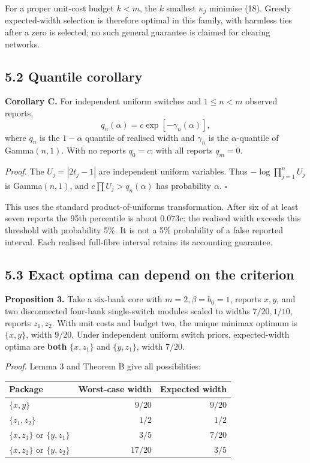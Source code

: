 \documentclass[
  british,
  11pt,
  a4paper,
]{article}
\newcounter{none} %
\begin{document}
For a proper unit-cost budget \(k<m\), the \(k\) smallest \(\kappa_j\)
minimise (18). Greedy expected-width selection is therefore optimal in
this family, with harmless ties after a zero is selected; no such
general guarantee is claimed for clearing networks.

\subsection{5.2 Quantile corollary}\label{quantile-corollary}

\textbf{Corollary C.} For independent uniform switches and \(1\le n<m\)
observed reports, \[
q_n(\alpha)=c\exp[-\gamma_n(\alpha)],
\tag{20}
\] where \(q_n\) is the \(1-\alpha\) quantile of realised width and
\(\gamma_n\) is the \(\alpha\)-quantile of Gamma\((n,1)\). With no
reports \(q_0=c\); with all reports \(q_m=0\).

\emph{Proof.} The \(U_j=|2t_j-1|\) are independent uniform variables.
Thus \(-\log\prod_{j=1}^nU_j\) is Gamma\((n,1)\), and
\(c\prod U_j>q_n(\alpha)\) has probability \(\alpha\). \(\square\)

This uses the standard product-of-uniforms transformation. After six of
at least seven reports the 95th percentile is about \(0.073c\): the
realised width exceeds this threshold with probability 5\%. It is not a
5\% probability of a false reported interval. Each realised full-fibre
interval retains its accounting guarantee.

\subsection{5.3 Exact optima can depend on the
criterion}\label{exact-optima-can-depend-on-the-criterion}

\textbf{Proposition 3.} Take a six-bank core with \(m=2,\beta=b_0=1\),
reports \(x,y\), and two disconnected four-bank single-switch modules
scaled to widths \(7/20,1/10\), reports \(z_1,z_2\). With unit costs and
budget two, the unique minimax optimum is \(\{x,y\}\), width \(9/20\).
Under independent uniform switch priors, expected-width optima are
\textbf{both} \(\{x,z_1\}\) and \(\{y,z_1\}\), width \(7/20\).

\emph{Proof.} Lemma 3 and Theorem B give all possibilities:

{\def\LTcaptype{none} %
\begin{longtable}[]{@{}lrr@{}}
\toprule\noalign{}
Package & Worst-case width & Expected width \\
\midrule\noalign{}
\endhead
\bottomrule\noalign{}
\endlastfoot
\(\{x,y\}\) & \(9/20\) & \(9/20\) \\
\(\{z_1,z_2\}\) & \(1/2\) & \(1/2\) \\
\(\{x,z_1\}\) or \(\{y,z_1\}\) & \(3/5\) & \(7/20\) \\
\(\{x,z_2\}\) or \(\{y,z_2\}\) & \(17/20\) & \(3/5\) \\
\end{longtable}
}
\end{document}
